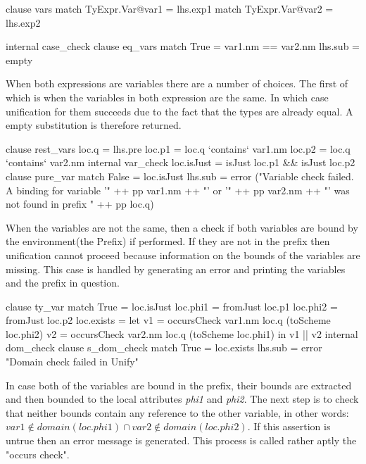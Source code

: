 \begin{code}
clause vars
  match TyExpr.Var@var1 = lhs.exp1
  match TyExpr.Var@var2 = lhs.exp2
  
  internal case_check
    clause eq_vars
      match True = var1.nm == var2.nm
      lhs.sub = empty
\end{code}
When both expressions are variables there are a number of choices. The first of which is when the variables in both expression are the same. In which case unification for them succeeds due to the fact that the types are already equal. A empty substitution is therefore returned.

\begin{code}
clause rest_vars
  loc.q  = lhs.pre
  loc.p1 = loc.q `contains` var1.nm
  loc.p2 = loc.q `contains` var2.nm
  internal var_check
    loc.isJust    = isJust loc.p1 && isJust loc.p2
    clause pure_var
      match False = loc.isJust
      lhs.sub = error ("Variable check failed. A binding for variable '" ++ pp var1.nm ++ "' or '" ++ pp var2.nm ++ "' was not found in prefix " ++ pp loc.q)
\end{code}
When the variables are not the same, then a check if both variables are bound by the environment(the Prefix) if performed. If they are not in the prefix then unification cannot proceed because information on the bounds of the variables are missing. This case is handled by generating an error and printing the variables and the prefix in question.

\begin{code} 
clause ty_var
  match True  = loc.isJust
  loc.phi1 = fromJust loc.p1
  loc.phi2 = fromJust loc.p2
  loc.exists = let v1 = occursCheck var1.nm loc.q (toScheme loc.phi2)
                   v2 = occursCheck var2.nm loc.q (toScheme loc.phi1)
               in v1 || v2
  internal dom_check
    clause s_dom_check
      match True  = loc.exists
      lhs.sub = error "Domain check failed in Unify"
\end{code}
In case both of the variables are bound in the prefix, their bounds are extracted and then bounded to the local attributes \emph{phi1} and \emph{phi2}. The next step is to check that neither bounds contain any reference to the other variable, in other words: $var1 \notin domain(loc.phi1) \cap var2 \notin domain(loc.phi2)$. If this assertion is untrue then an error message is generated. This process is called rather aptly the "occurs check".

